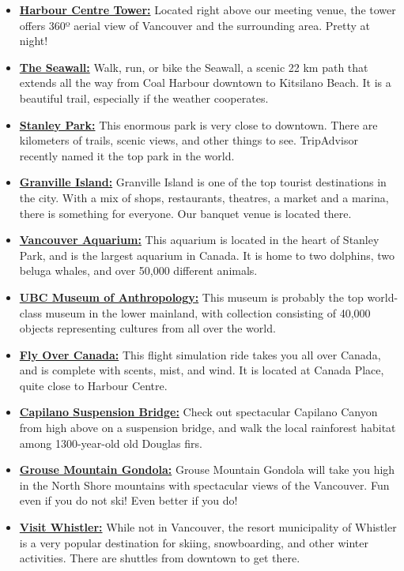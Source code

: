 \documentclass[letterpaper,12pt]{article}
\begin{document}
\begin{itemize}
\setlength{\itemsep}{0pt}
\item \href{http://www.vancouverlookout.com/}{\textbf{Harbour Centre Tower:}} Located right above our meeting venue, the tower offers 360º aerial view of Vancouver and the surrounding area. Pretty at night! 
\item \href{http://vancouver.ca/parks-recreation-culture/seawall.aspx}{\textbf{The Seawall:}} Walk, run, or bike the Seawall, a scenic 22 km path that extends all the way from Coal Harbour downtown to Kitsilano Beach. It is a beautiful trail, especially if the weather cooperates.
\item \href{http://vancouver.ca/parks-recreation-culture/stanley-park.aspx}{\textbf{Stanley Park:}} This enormous park is very close to downtown. There are kilometers of trails, scenic views, and other things to see. TripAdvisor recently named it the top park in the world.
\item \href{http://granvilleisland.com/}{\textbf{Granville Island:}} Granville Island is one of the top tourist destinations in the city. With a mix of shops, restaurants, theatres, a market and a marina, there is something for everyone. Our banquet venue is located there.
\item \href{http://www.vanaqua.ca}{\textbf{Vancouver Aquarium:}} This aquarium is located in the heart of Stanley Park, and is the largest aquarium in Canada. It is home to two dolphins, two beluga whales, and over 50,000 different animals.
\item \href{http://moa.ubc.ca/}{\textbf{UBC Museum of Anthropology:}} This museum is probably the top world-class museum in the lower mainland, with collection consisting of 40,000 objects representing cultures from all over the world.
\item \href{http://www.flyovercanada.com}{\textbf{Fly Over Canada:}} This flight simulation ride takes you all over Canada, and is complete with scents, mist, and wind. It is located at Canada Place, quite close to Harbour Centre.
\item \href{http://www.capbridge.com/}{\textbf{Capilano Suspension Bridge:}} Check out spectacular Capilano Canyon from high above on a suspension bridge, and walk the local rainforest habitat among 1300-year-old old Douglas firs.
\item \href{http://www.grousemountain.com/}{\textbf{Grouse Mountain Gondola:}} Grouse Mountain Gondola will take you high in the North Shore mountains with spectacular views of the Vancouver. Fun even if you do not ski! Even better if you do!
\item \href{http://www.whistlerblackcomb.com/}{\textbf{Visit Whistler:}} While not in Vancouver, the resort municipality of Whistler is a very popular destination for skiing, snowboarding, and other winter activities. There are shuttles from downtown to get there.
\end{itemize}
\end{document}

